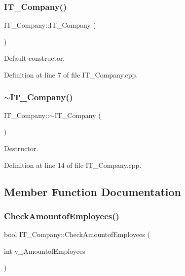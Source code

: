 \subsubsection{\texorpdfstring{I\+T\+\_\+\+Company()}{IT\_Company()}}
{\footnotesize\ttfamily I\+T\+\_\+\+Company\+::\+I\+T\+\_\+\+Company (\begin{DoxyParamCaption}{ }\end{DoxyParamCaption})}



Default constructor. 



Definition at line 7 of file I\+T\+\_\+\+Company.\+cpp.

\mbox{\label{class_i_t___company_aacbb3e9ae0d6d8a41a25785484cfc05f}} 
\subsubsection{\texorpdfstring{$\sim$\+I\+T\+\_\+\+Company()}{~IT\_Company()}}
{\footnotesize\ttfamily I\+T\+\_\+\+Company\+::$\sim$\+I\+T\+\_\+\+Company (\begin{DoxyParamCaption}{ }\end{DoxyParamCaption})}



Destructor. 



Definition at line 14 of file I\+T\+\_\+\+Company.\+cpp.



\subsection{Member Function Documentation}
\mbox{\label{class_i_t___company_a8214142064b5b8f6fed854b45f83a2aa}} 
\subsubsection{\texorpdfstring{Check\+Amountof\+Employees()}{CheckAmountofEmployees()}}
{\footnotesize\ttfamily bool I\+T\+\_\+\+Company\+::\+Check\+Amountof\+Employees (\begin{DoxyParamCaption}\item[{int}]{v\+\_\+\+Amountof\+Employees }\end{DoxyParamCaption})}



